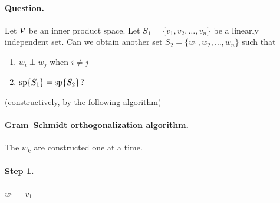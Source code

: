\paragraph{Question.} Let $\mathcal{V}$ be an inner product space. Let $S_1 = \{v_1, v_2, \ldots, v_n\}$ be a linearly independent set. Can we obtain another set $S_2 = \{w_1, w_2, \ldots, w_n\}$ such that
\begin{enumerate}[label=\arabic*)]
\item $w_i\perp w_j$ when $i\neq j$
\item $\operatorname{sp}\{S_1\} = \operatorname{sp}\{S_2\}$?
\end{enumerate}
 (constructively, by the following algorithm)

\paragraph{Gram--Schmidt orthogonalization algorithm.} The $w_k$ are constructed one at a time.
\paragraph{Step 1.} $w_1 = v_1$

